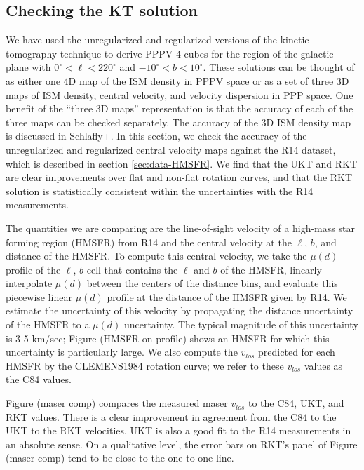 \subsection{Checking the KT solution}
\label{sec:KT-validation}

We have used the unregularized and regularized versions of the kinetic tomography technique to derive PPPV 4-cubes for the region of the galactic plane with $0^\circ < \ell < 220^\circ$ and $-10^\circ < b < 10^\circ$. %
These solutions can be thought of as either one 4D map of the ISM density in PPPV space or as a set of three 3D maps of ISM density, central velocity, and velocity dispersion in PPP space. One benefit of the ``three 3D maps'' representation is that the accuracy of each of the three maps can be checked separately. The accuracy of the 3D ISM density map is discussed in Schlafly+. In this section, we check the accuracy of the unregularized and regularized central velocity maps against the R14 dataset, which is described in section \ref{sec:data-HMSFR}. We find that the UKT and RKT are clear improvements over flat and non-flat rotation curves, and that the RKT solution is statistically consistent within the uncertainties with the R14 measurements. 

The quantities we are comparing are the line-of-sight velocity of a high-mass star forming region (HMSFR) from R14 and the central velocity at the $\ell$, $b$, and distance of the HMSFR. To compute this central velocity, we take the $\mu(d)$ profile of the $\ell$, $b$ cell that contains the $\ell$ and $b$ of the HMSFR, linearly interpolate $\mu(d)$ between the centers of the distance bins, and evaluate this piecewise linear $\mu(d)$ profile at the distance of the HMSFR given by R14. We estimate the uncertainty of this velocity by propagating the distance uncertainty of the HMSFR to a $\mu(d)$ uncertainty. The typical magnitude of this uncertainty is 3-5 km/sec; Figure (HMSFR on profile) shows an HMSFR for which this uncertainty is particularly large. We also compute the $v_{los}$ predicted for each HMSFR by the CLEMENS1984 rotation curve; we refer to these $v_{los}$ values as the C84 values. 

Figure (maser comp) compares the measured maser $v_{los}$ to the C84, UKT, and  RKT values. There is a clear improvement in agreement from the C84 to the UKT to the RKT velocities. UKT is also a good fit to the R14 measurements in an absolute sense. On a qualitative level, the error bars on RKT's panel of Figure (maser comp) tend to be close to the one-to-one line. 


